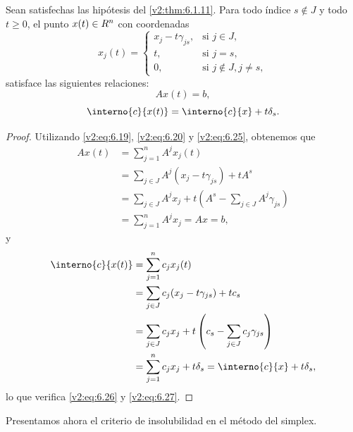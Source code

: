\begin{lemma}\label{v2:lem:6.1.2}
    Sean satisfechas las hipótesis del \cref{v2:thm:6.1.11}. Para todo índice $s \notin J$ y todo $t \ge 0$, el punto $x(t) \in R^n$ con coordenadas
    \begin{equation}
        x_j(t) = \begin{cases} 
            x_j - t \gamma_{js}, & \text{si } j \in J, \\
            t, & \text{si } j = s, \\
            0, & \text{si } j \notin J, j \neq s,
        \end{cases}
        \label{v2:eq:6.25}
    \end{equation}
    satisface las siguientes relaciones:
    \begin{equation}
        Ax(t) = b,
        \label{v2:eq:6.26}
    \end{equation}
    \begin{equation}
        \interno{c}{x(t)} = \interno{c}{x} + t\delta_s.
        \label{v2:eq:6.27}
    \end{equation}
\end{lemma}

\begin{proof}
    Utilizando \eqref{v2:eq:6.19}, \eqref{v2:eq:6.20} y \eqref{v2:eq:6.25}, obtenemos que
    \begin{align*}
        Ax(t) &= \sum_{j=1}^n A^j x_j(t) \\
        &= \sum_{j \in J} A^j (x_j - t \gamma_{js}) + t A^s \\
        &= \sum_{j \in J} A^j x_j + t \left( A^s - \sum_{j \in J} A^j \gamma_{js} \right) \\
        &= \sum_{j=1}^n A^j x_j = Ax = b,
    \end{align*}
    y
    \begin{align*}
        \interno{c}{x(t)} &= \sum_{j=1}^n c_j x_j(t) \\
        &= \sum_{j \in J} c_j (x_j - t \gamma_{js}) + t c_s \\
        &= \sum_{j \in J} c_j x_j + t \left( c_s - \sum_{j \in J} c_j \gamma_{js} \right) \\
        &= \sum_{j=1}^n c_j x_j + t \delta_s = \interno{c}{x} + t \delta_s,
    \end{align*}
    lo que verifica \eqref{v2:eq:6.26} y \eqref{v2:eq:6.27}.
\end{proof}

Presentamos ahora el criterio de insolubilidad en el método del simplex.

